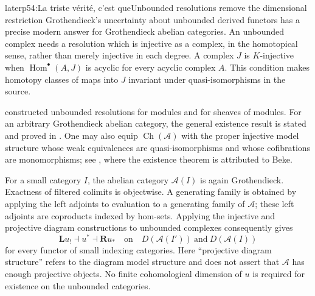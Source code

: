 \begin{dcomment}{later}{p54:La triste vérité, c'est que}{Unbounded resolutions remove the dimensional restriction}
Grothendieck's uncertainty about unbounded derived functors has a precise modern answer for Grothendieck abelian categories. An unbounded complex needs a resolution which is injective as a complex, in the homotopical sense, rather than merely injective in each degree. A complex $J$ is $K$-injective when $\operatorname{Hom}^\bullet(A,J)$ is acyclic for every acyclic complex $A$. This condition makes homotopy classes of maps into $J$ invariant under quasi-isomorphisms in the source.

\citet[Theorems~C and D]{Spaltenstein1988} constructed unbounded resolutions for modules and for sheaves of modules. For an arbitrary Grothendieck abelian category, the general existence result is stated and proved in \citet[Theorem~19.12.6, tag 079P]{StacksKInjectives}. One may also equip $\operatorname{Ch}(\mathcal A)$ with the proper injective model structure whose weak equivalences are quasi-isomorphisms and whose cofibrations are monomorphisms; see \citet[Theorem~1.2]{CisinskiDeglise2009}, where the existence theorem is attributed to Beke.

For a small category $I$, the abelian category $\mathcal A(I)$ is again Grothendieck. Exactness of filtered colimits is objectwise. A generating family is obtained by applying the left adjoints to evaluation to a generating family of $\mathcal A$; these left adjoints are coproducts indexed by hom-sets. Applying the injective and projective diagram constructions to unbounded complexes consequently gives
\[
 \mathbf L u_!\dashv u^*\dashv\mathbf R u_*
 \quad\text{on}\quad
 D(\mathcal A(I'))\ \text{and}\ D(\mathcal A(I))
\]
for every functor of small indexing categories. Here ``projective diagram structure'' refers to the diagram model structure and does not assert that $\mathcal A$ has enough projective objects. No finite cohomological dimension of $u$ is required for existence on the unbounded categories.


\end{dcomment}
